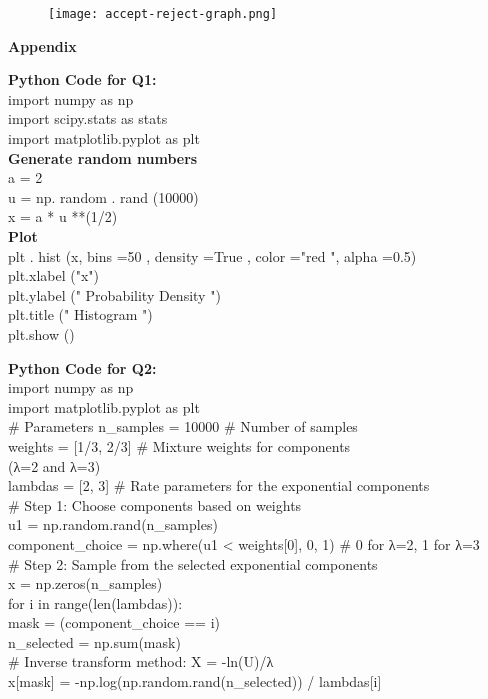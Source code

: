 \documentclass[final,11pt]{article}
\begin{document}
\begin{spacing}{1.25}
\begin{figure} [H]
    \centering
    \texttt{[image: accept-reject-graph.png]}
    \label{fig:enter-label}
\end{figure}

\newpage

\textbf{Appendix}

{\color{blue}
    \textbf{Python Code for Q1:} \\
    import numpy as np \\
    import scipy.stats as stats \\
    import matplotlib.pyplot as plt \\
    \textbf{Generate random numbers} \\
    a = 2 \\
    u = np. random . rand (10000) \\
    x = a * u **(1/2)  \\
    \textbf{Plot} \\ 
    plt . hist (x, bins =50 , density =True , color ="red ", alpha =0.5) \\
    plt.xlabel ("x") \\
    plt.ylabel (" Probability Density ") \\
    plt.title (" Histogram ") \\
    plt.show () \\
}

{\color{red}
 \textbf{Python Code for Q2:} \\
    import numpy as np \\
    import matplotlib.pyplot as plt\\

    # Parameters
    n_samples = 10000  # Number of samples \\
    weights = [1/3, 2/3]  # Mixture weights for components \\ (λ=2 and λ=3) \\
    lambdas = [2, 3]  # Rate parameters for the exponential components \\

    # Step 1: Choose components based on weights\\
    u1 = np.random.rand(n_samples)\\
    component_choice = np.where(u1 < weights[0], 0, 1)  # 0 for λ=2, 1 for λ=3 \\

    # Step 2: Sample from the selected exponential components \\
    x = np.zeros(n_samples) \\
        for i in range(len(lambdas)): \\
        mask = (component_choice == i) \\
        n_selected = np.sum(mask) \\
        # Inverse transform method: X = -ln(U)/λ \\
        x[mask] = -np.log(np.random.rand(n_selected)) / lambdas[i] \\

}
\end{spacing}
\end{document}
